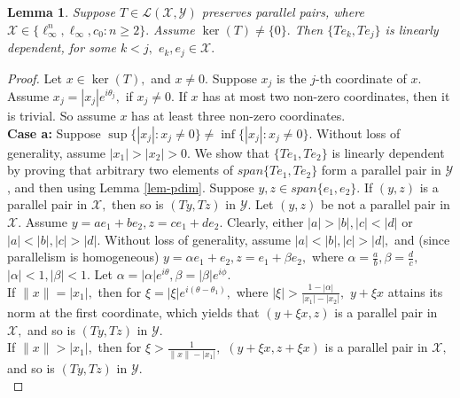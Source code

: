 \documentclass{amsart}
\newtheorem{lemma}[theorem]{Lemma}
\theoremstyle{definition}
\theoremstyle{remark}
\numberwithin{equation}{section}
\begin{document}
\begin{lemma}\label{lem-nind}
		Suppose $T\in \mathcal{L}(\mathcal{X},\mathcal{Y})$  preserves parallel pairs, where  $\mathcal{X}\in\{\ell_\infty^n,\ell_\infty, c_0:n\geq 2\}.$ 
		 Assume $\ker(T)\neq \{0\}.$ Then   $\{Te_k,Te_j\}$ is linearly dependent, for some $ k<j, $ $e_k,e_j\in \mathcal{X}.$
\end{lemma}
\begin{proof}
Let $x\in \ker(T),$ and $x\neq 0.$	 Suppose $x_j$ is the $j$-th coordinate of $x.$ Assume $x_j=|x_j|e^{i\theta_j},$ if $x_j\neq 0.$ If $x$ has at most two non-zero coordinates, then it is trivial. So assume $x$ has at least three non-zero coordinates. \\



\textbf{Case a:} Suppose $\sup\{|x_j|:x_j\neq 0\}\neq \inf\{|x_j|:x_j\neq 0\}.$ Without loss of generality, assume $|x_1|>|x_2|>0.$ We show that $\{Te_1,Te_2\}$ is linearly dependent by proving that arbitrary two elements of $span\{Te_1,Te_2\}$ form a parallel pair in $\mathcal{Y}$, and then using Lemma \ref{lem-pdim}. Suppose $y,z\in span\{e_1,e_2\}.$ If $(y,z)$ is a parallel pair in $\mathcal{X},$ then so is $(Ty,Tz)$  in $\mathcal{Y}.$ Let $(y,z)$ be not a parallel pair in $\mathcal{X}.$ Assume $y=ae_1+be_2, z=ce_1+de_2.$ Clearly, either $|a|>|b|, |c|<|d|$ or $|a|<|b|,|c|>|d|.$ Without loss of generality, assume $|a|<|b|,|c|>|d|,$ and (since parallelism is homogeneous) $y=\alpha e_1+e_2, z=e_1+\beta e_2,$ where $\alpha=\frac{a}{b},\beta=\frac{d}{c},$ $|\alpha|<1,|\beta|<1.$ Let $\alpha=|\alpha|e^{i\theta},\beta=|\beta|e^{i\phi}.$\\
If $\|x\|=|x_1|,$ then for $\xi=|\xi|e^{i(\theta-\theta_1)},$ where $|\xi|>\frac{1-|\alpha|}{|x_1|-|x_2|},$ 
 $y+\xi x$ attains its norm at the first coordinate, which yields that $(y+\xi x,z)$ is a parallel pair in $\mathcal{X},$ and so is $(Ty,Tz)$ in $\mathcal{Y}.$\\
 If $\|x\|> |x_1|,$ then for $\xi>\frac{1}{\|x\|-|x_1|},$ $(y+\xi x,z+\xi x)$ is a parallel pair in $\mathcal{X},$ and so is $(Ty,Tz)$ in $\mathcal{Y}.$\\


\end{proof}
\end{document}
